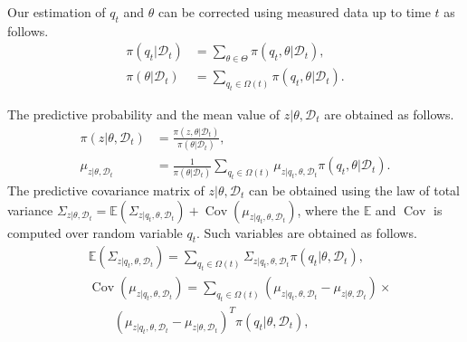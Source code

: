 \documentclass[letterpaper, 10 pt, conference]{ieeeconf}
\newcommand{\mc}[1]{\mathcal{#1}} \newcommand{\mb}[1]{\mathbf{#1}}
\newcommand{\Cov}{\operatorname{Cov}}
\newcommand{\E}{\mathbb{E}}
\newcommand{\D}[2]{\mc{D}_{#2}}
\newcommand{\q}[1]{{q_{#1}}}
\begin{document}
Our estimation of $q_t$ and $\theta$ can be corrected using measured data up to time $t$ as follows.
\begin{equation}
\begin{split}
 \pi \left( \q{t}|\D{0}{t} \right) &= \sum\limits_{\theta \in \Theta} {{\pi \left( \q{t},\theta |\D{0}{t} \right) } }, \\
 \pi \left( \theta |\D{0}{t} \right) &= \sum\limits_{q_t \in \Omega(t)} {{\pi \left( \q{t},\theta |\D{}{t} \right) } }. 
\end{split}
\label{eq:}
\end{equation} 

The predictive probability and  {the   mean value} of $z |\theta,\D{0}{t}$ are obtained as follows.
\begin{equation}
\begin{split}
\pi \left( z |\theta,\D{0}{t} \right) &= \frac{\pi \left( z,\theta |\D{0}{t} \right)}{\pi \left( \theta |\D{0}{t} \right)},\\
\mu_{z|\theta, \D{}{t}} &= \frac{1}{\pi \left(\theta |\D{}{t} \right)}\sum\limits_{q_t \in \Omega(t)} \mu_{z|\q{t},\theta, \D{}{t}} \pi \left( \q{t},\theta |\D{}{t} \right). 
\end{split}
\label{eq:}
\end{equation}
The predictive covariance matrix of $z |\theta,\D{0}{t}$ can be obtained using the law of total variance $\Sigma_{z|\theta, \D{}{t}} = \mathbb{E} \left(\Sigma_{z|\q{t},\theta, \D{}{t}}\right) + \Cov \left(\mu_{z|\q{t},\theta, \D{}{t}} \right)$, where the $\E$ and $\Cov$ is computed over random variable $q_t$. Such variables are obtained as follows.
 {
\begin{equation}
\begin{split}
&\E \left(\Sigma_{z|\q{t},\theta, \D{}{t}}\right) = \sum\limits_{q_t \in \Omega(t)} \Sigma_{z|\q{t},\theta, \D{}{t}} \pi \left( \q{t} |\theta,\D{}{t} \right),\\
&\Cov \left(\mu_{z|\q{t},\theta, \D{}{t}} \right) = \sum\limits_{q_t \in \Omega(t)} \left(\mu_{z|\q{t},\theta, \D{}{t}} - \mu_{z|\theta, \D{}{t}}\right) \times \\ 
&\quad \quad \left(\mu_{z|\q{t},\theta, \D{}{t}} - \mu_{z|\theta, \D{}{t}}\right)^T \pi \left( \q{t} |\theta,\D{}{t} \right),\\
\end{split}
\end{equation}}
\end{document}
